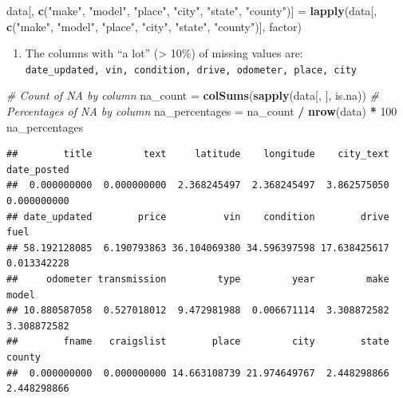 \documentclass[
]{article}
\newenvironment{Shaded}{\begin{snugshade}}{\end{snugshade}}
\newcommand{\CommentTok}[1]{\textcolor[rgb]{0.56,0.35,0.01}{\textit{#1}}}
\newcommand{\DecValTok}[1]{\textcolor[rgb]{0.00,0.00,0.81}{#1}}
\newcommand{\KeywordTok}[1]{\textcolor[rgb]{0.13,0.29,0.53}{\textbf{#1}}}
\newcommand{\NormalTok}[1]{#1}
\newcommand{\OperatorTok}[1]{\textcolor[rgb]{0.81,0.36,0.00}{\textbf{#1}}}
\newcommand{\StringTok}[1]{\textcolor[rgb]{0.31,0.60,0.02}{#1}}
\providecommand{\tightlist}{%
  \setlength{\itemsep}{0pt}\setlength{\parskip}{0pt}}
\begin{document}
\begin{Shaded}
\begin{Highlighting}[]
\NormalTok{data[, }\KeywordTok{c}\NormalTok{(}\StringTok{"make"}\NormalTok{, }\StringTok{"model"}\NormalTok{, }\StringTok{"place"}\NormalTok{, }\StringTok{"city"}\NormalTok{, }\StringTok{"state"}\NormalTok{, }\StringTok{"county"}\NormalTok{)] =}
\StringTok{   }\KeywordTok{lapply}\NormalTok{(data[, }\KeywordTok{c}\NormalTok{(}\StringTok{"make"}\NormalTok{, }\StringTok{"model"}\NormalTok{, }\StringTok{"place"}\NormalTok{, }\StringTok{"city"}\NormalTok{, }\StringTok{"state"}\NormalTok{, }\StringTok{"county"}\NormalTok{)], }
\NormalTok{   factor)}
\end{Highlighting}
\end{Shaded}

\begin{enumerate}
\def\labelenumi{\arabic{enumi}.}
\setcounter{enumi}{2}
\tightlist
\item
  The columns with ``a lot'' (\textgreater{} 10\%) of missing values
  are:
  \texttt{date\_updated,\ vin,\ condition,\ drive,\ odometer,\ place,\ city}
\end{enumerate}

\begin{Shaded}
\begin{Highlighting}[]
\CommentTok{\# Count of NA by column}
\NormalTok{na\_count =}\StringTok{ }\KeywordTok{colSums}\NormalTok{(}\KeywordTok{sapply}\NormalTok{(data[, ], is.na))}
\CommentTok{\# Percentages of NA by column}
\NormalTok{na\_percentages =}\StringTok{ }\NormalTok{na\_count }\OperatorTok{/}\StringTok{ }\KeywordTok{nrow}\NormalTok{(data) }\OperatorTok{*}\StringTok{ }\DecValTok{100}
\NormalTok{na\_percentages}
\end{Highlighting}
\end{Shaded}

\begin{verbatim}
##        title         text     latitude    longitude    city_text  date_posted 
##  0.000000000  0.000000000  2.368245497  2.368245497  3.862575050  0.000000000 
## date_updated        price          vin    condition        drive         fuel 
## 58.192128085  6.190793863 36.104069380 34.596397598 17.638425617  0.013342228 
##     odometer transmission         type         year         make        model 
## 10.880587058  0.527018012  9.472981988  0.006671114  3.308872582  3.308872582 
##        fname   craigslist        place         city        state       county 
##  0.000000000  0.000000000 14.663108739 21.974649767  2.448298866  2.448298866
\end{verbatim}
\end{document}

